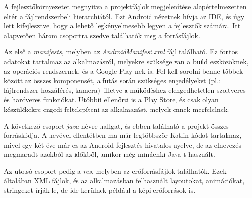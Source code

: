A fejlesztőkörnyezetet megnyitva a projektfájlok megjelenítése alapértelmezetten eltér a fájlrendszerbeli hierarchiától. Ezt Android nézetnek hívja az IDE, és úgy lett kifejlesztve, hogy a lehető legkényelmesebb legyen a fejlesztők számára. Itt alapvetően három csoportra szedve találhatók meg a forrásfájlok. 

Az első a \emph{manifests}, melyben az \emph{AndroidManifest.xml} fájl található. Ez fontos adatokat tartalmaz az alkalmazásról, melyekre szüksége van a build eszközöknek, az operációs rendszernek, és a Google Play-nek is. Fel kell sorolni benne többek között az összes komponensét, a futás során szükséges engedélyeket (pl.: fájlrendszer-hozzáférés, kamera), illetve a működéshez elengedhetetlen szoftveres és hardveres funkciókat. Utóbbit ellenőrzi is a Play Store, és csak olyan készülékekre engedi feltelepíteni az alkalmazást, melyek ennek megfelelnek. \cite{Manifest}

A következő csoport \emph{java} névre hallgat, és ebben található a projekt összes forráskódja. A nevével ellentétben ma már legtöbbször Kotlin kódot tartalmaz, mivel egy-két éve már ez az Android fejlesztés hivatalos nyelve, de az elnevezés megmaradt azokból az időkből, amikor még mindenki Java-t használt. 

Az utolsó csoport pedig a \emph{res}, melyben az erőforrásfájlok találhatók. Ezek általában XML fájlok, és az alkalmazásban felhasznált layoutokat, animációkat, stringeket írják le, de ide kerülnek például a képi erőforrások is. 